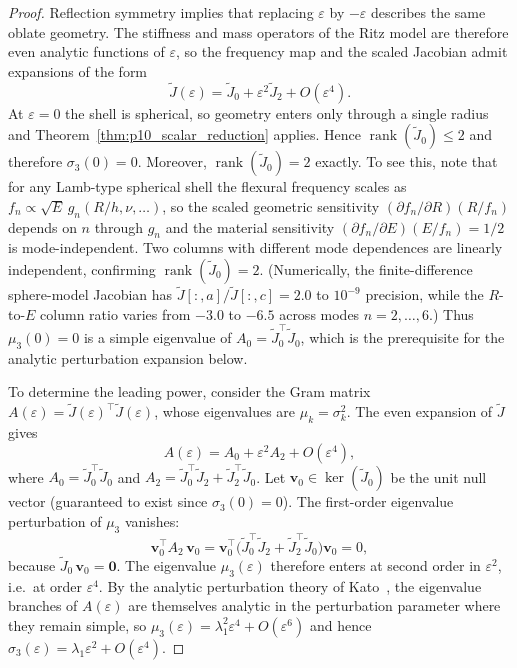 \begin{proof}
Reflection symmetry implies that replacing $\varepsilon$ by $-\varepsilon$
describes the same oblate geometry.  The stiffness and mass operators of the
Ritz model are therefore even analytic functions of $\varepsilon$, so the
frequency map and the scaled Jacobian admit expansions of the form
\begin{equation}
  \widetilde{J}(\varepsilon)
  =
  \widetilde{J}_0 + \varepsilon^2 \widetilde{J}_2 + O(\varepsilon^4).
  \label{eq:p10_J_even_expansion}
\end{equation}
At $\varepsilon=0$ the shell is spherical, so geometry enters only through a
single radius and Theorem~\ref{thm:p10_scalar_reduction} applies.  Hence
$\operatorname{rank}(\widetilde{J}_0)\leq 2$ and therefore $\sigma_3(0)=0$.
Moreover, $\operatorname{rank}(\widetilde{J}_0)=2$ exactly.  To see this, note
that for any Lamb-type spherical shell the flexural frequency scales as
$f_n \propto \sqrt{E}\,g_n(R/h,\nu,\ldots)$, so the scaled geometric sensitivity
$(\partial f_n/\partial R)(R/f_n)$ depends on $n$ through $g_n$ and the
material sensitivity $(\partial f_n/\partial E)(E/f_n)=1/2$ is mode-independent.
Two columns with different mode dependences are linearly independent,
confirming $\operatorname{rank}(\widetilde{J}_0)=2$.  (Numerically, the
finite-difference sphere-model Jacobian has $\widetilde{J}[:,a]/\widetilde{J}[:,c]=2.0$
to $10^{-9}$ precision, while the $R$-to-$E$ column ratio varies from $-3.0$ to
$-6.5$ across modes $n=2,\ldots,6$.)  Thus $\mu_3(0)=0$ is a simple eigenvalue of
$A_0=\widetilde{J}_0^\top\widetilde{J}_0$, which is the prerequisite for the
analytic perturbation expansion below.

To determine the leading power, consider the Gram matrix
$A(\varepsilon)=\widetilde{J}(\varepsilon)^\top\widetilde{J}(\varepsilon)$,
whose eigenvalues are $\mu_k=\sigma_k^2$.  The even expansion of
$\widetilde{J}$ gives
\begin{equation}
  A(\varepsilon)
  =
  A_0 + \varepsilon^2 A_2 + O(\varepsilon^4),
  \label{eq:p10_A_even_expansion}
\end{equation}
where
$A_0=\widetilde{J}_0^\top\widetilde{J}_0$ and
$A_2=\widetilde{J}_0^\top\widetilde{J}_2+\widetilde{J}_2^\top\widetilde{J}_0$.
Let $\mathbf{v}_0\in\ker(\widetilde{J}_0)$ be the unit null vector
(guaranteed to exist since $\sigma_3(0)=0$).  The first-order eigenvalue
perturbation of $\mu_3$ vanishes:
\begin{equation}
  \mathbf{v}_0^\top A_2\,\mathbf{v}_0
  =
  \mathbf{v}_0^\top\bigl(
    \widetilde{J}_0^\top\widetilde{J}_2
    +\widetilde{J}_2^\top\widetilde{J}_0
  \bigr)\mathbf{v}_0
  =
  0,
  \label{eq:p10_first_order_vanish}
\end{equation}
because $\widetilde{J}_0\,\mathbf{v}_0=\mathbf{0}$.  The eigenvalue
$\mu_3(\varepsilon)$ therefore enters at second order in $\varepsilon^2$,
i.e.\ at order $\varepsilon^4$.  By the analytic perturbation theory of
Kato~\cite{Kato1966}, the eigenvalue branches of $A(\varepsilon)$ are
themselves analytic in the perturbation parameter where they remain simple,
so $\mu_3(\varepsilon)=\lambda_1^2\varepsilon^4+O(\varepsilon^6)$ and hence
$\sigma_3(\varepsilon)=\lambda_1\varepsilon^2+O(\varepsilon^4)$.


\end{proof}

